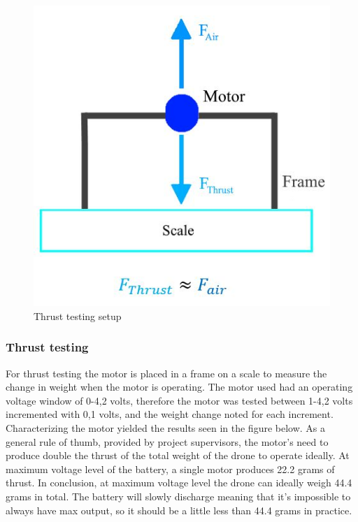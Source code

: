 \begin{figure}[H]
\begin{center}
   \includegraphics[scale =1]{pictures/control/Motor thrust 2.JPG}
\end{center}
\caption{Thrust testing setup}
\end{figure}

\subsubsection{Thrust testing}

For thrust testing the motor is placed in a frame on a scale to measure the change in weight when the motor is operating. The motor used had an operating voltage window of 0-4,2 volts, therefore the motor was tested between 1-4,2 volts incremented with 0,1 volts, and the weight change noted for each increment. Characterizing the motor yielded the results seen in the figure below.
As a general rule of thumb, provided by project supervisors, the motor's need to produce double the thrust of the total weight of the drone to operate ideally.
At maximum voltage level of the battery, a single motor produces 22.2 grams of thrust. In conclusion, at maximum voltage level the drone can ideally weigh 44.4 grams in total. The battery will slowly discharge meaning that it's impossible to always have max output, so it should be a little less than 44.4 grams in practice.

